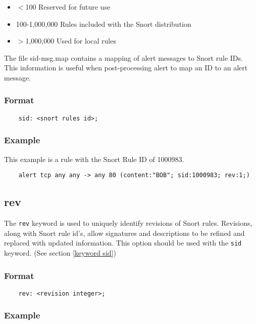 \documentclass[english]{report}
\begin{document}
\begin{itemize}
\item $<$100 Reserved for future use
\item 100-1,000,000 Rules included with the Snort distribution
\item $>$1,000,000 Used for local rules
\end{itemize}

The file sid-msg.map contains a mapping of alert messages to Snort rule IDs.
This information is useful when post-processing alert to map an ID to an alert
message.  

\subsubsection{Format}

\begin{verbatim}
    sid: <snort rules id>;
\end{verbatim}

\subsubsection{Example}

This example is a rule with the Snort Rule ID of 1000983.

\begin{verbatim}
    alert tcp any any -> any 80 (content:"BOB"; sid:1000983; rev:1;)
\end{verbatim}

\subsection{rev}
\label{keyword rev}

The \texttt{rev} keyword is used to uniquely identify revisions of Snort rules.
Revisions, along with Snort rule id's, allow signatures and descriptions to be
refined and replaced with updated information.  This option should be used with
the \texttt{sid} keyword.  (See section \ref{keyword sid})

\subsubsection{Format}

\begin{verbatim}
    rev: <revision integer>;
\end{verbatim}

\subsubsection{Example}
\end{document}
